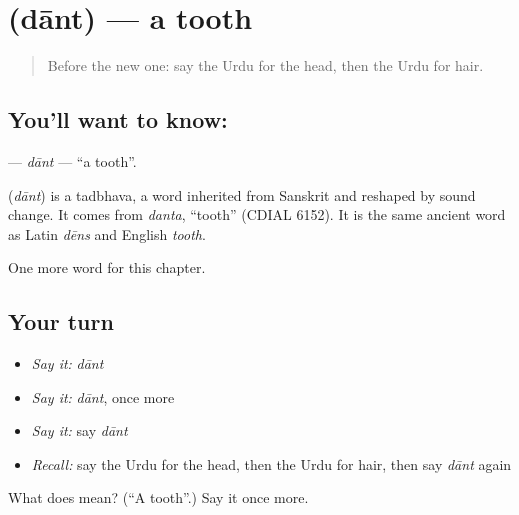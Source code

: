 \section[\texorpdfstring{\ur{دانت} (dānt)}{دانت (dānt)}]{ (dānt) — a tooth}

\label{lesson:UR-C38-dant}



\begin{quote}
Before the new one: say the Urdu for the head, then the Urdu for hair.
\end{quote}

\subsection*{You'll want to know: }
\textbf{} — \emph{dānt} — \textquotedblleft{}a tooth\textquotedblright{}.

\begin{cousinweb}
\textbf{} (\emph{dānt}) is a tadbhava, a word inherited from Sanskrit and reshaped by sound change. It comes from \emph{danta}, \textquotedblleft{}tooth\textquotedblright{} (CDIAL 6152). It is the same ancient word as Latin \emph{dēns} and English \emph{tooth}.
\end{cousinweb}

\begin{grammarlens}[title={What you've built}]
One more word for this chapter.
\end{grammarlens}

\subsection*{Your turn}
\begin{itemize}
\raggedright
  \item \emph{Say it:} \emph{dānt}
  \item \emph{Say it:} \emph{dānt}, once more
  \item \emph{Say it:} say \emph{dānt}
  \item \emph{Recall:} say the Urdu for the head, then the Urdu for hair, then say \emph{dānt} again
\end{itemize}

\begin{tcolorbox}[breakable,colback=teal!4,colframe=teal!35!black,title={Before you move on}]
What does  mean? (\textquotedblleft{}A tooth\textquotedblright{}.) Say it once more.
\end{tcolorbox}
